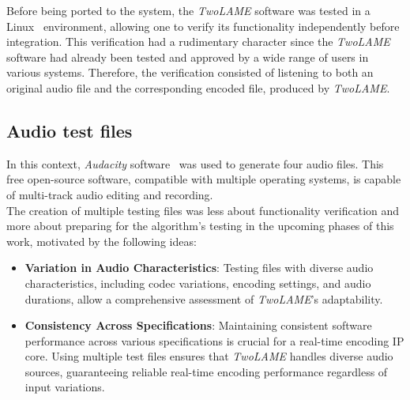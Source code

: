 Before being ported to the system, the \textit{TwoLAME} software was tested in a Linux~\cite{bib:gnulinux} environment, allowing one to verify its functionality independently before integration. This verification had a rudimentary character since the \textit{TwoLAME} software had already been tested and approved by a wide range of users in various systems. Therefore, the verification consisted of listening to both an original audio file and the corresponding encoded file, produced by \textit{TwoLAME}.

\subsection{Audio test files}

In this context, \textit{Audacity} software~\cite{bib:audacity} was used to generate four audio files. This free open-source software, compatible with multiple operating systems, is capable of multi-track audio editing and recording.\\
The creation of multiple testing files was less about functionality verification and more about preparing for the algorithm's testing in the upcoming phases of this work, motivated by the following ideas:

\begin{itemize}

    \item \textbf{Variation in Audio Characteristics}: Testing files with diverse audio characteristics, including codec variations, encoding settings, and audio durations, allow a comprehensive assessment of \textit{TwoLAME}'s adaptability.
    \item \textbf{Consistency Across Specifications}: Maintaining consistent software performance across various specifications is crucial for a real-time encoding IP core. Using multiple test files ensures that \textit{TwoLAME} handles diverse audio sources, guaranteeing reliable real-time encoding performance regardless of input variations.
\end{itemize}

